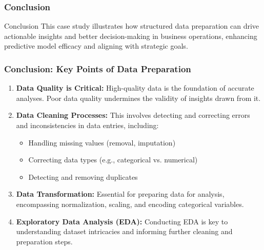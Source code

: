 \documentclass{beamer}
\begin{document}
\begin{frame}[fragile]
    \frametitle{Conclusion}
    \begin{block}{Conclusion}
        This case study illustrates how structured data preparation can drive actionable insights and better decision-making in business operations, enhancing predictive model efficacy and aligning with strategic goals.
    \end{block}
\end{frame}

\begin{frame}[fragile]
    \frametitle{Conclusion: Key Points of Data Preparation}
    \begin{enumerate}
        \item \textbf{Data Quality is Critical:} High-quality data is the foundation of accurate analyses. Poor data quality undermines the validity of insights drawn from it.
        
        \item \textbf{Data Cleaning Processes:} This involves detecting and correcting errors and inconsistencies in data entries, including:
        \begin{itemize}
            \item Handling missing values (removal, imputation)
            \item Correcting data types (e.g., categorical vs. numerical)
            \item Detecting and removing duplicates
        \end{itemize}

        \item \textbf{Data Transformation:} Essential for preparing data for analysis, encompassing normalization, scaling, and encoding categorical variables.

        \item \textbf{Exploratory Data Analysis (EDA):} Conducting EDA is key to understanding dataset intricacies and informing further cleaning and preparation steps.
    \end{enumerate}
\end{frame}
\end{document}
